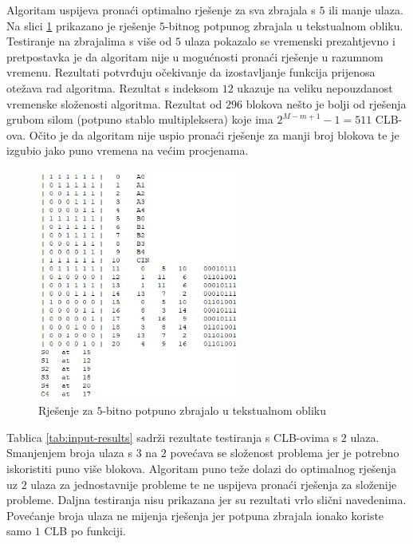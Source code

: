 \documentclass[times, utf8, diplomski]{fer}
\begin{document}
Algoritam uspijeva pronaći optimalno rješenje za sva zbrajala s $5$ ili manje ulaza. Na slici \ref{fig:adder5no-solution} prikazano je rješenje $5$-bitnog potpunog zbrajala u tekstualnom obliku. Testiranje na zbrajalima s više od $5$ ulaza pokazalo se vremenski prezahtjevno i pretpostavka je da algoritam nije u mogućnosti pronaći rješenje u razumnom vremenu. Rezultati potvrđuju očekivanje da izostavljanje funkcija prijenosa otežava rad algoritma. Rezultat s indeksom $12$ ukazuje na veliku nepouzdanost vremenske složenosti algoritma. Rezultat od $296$ blokova nešto je bolji od rješenja grubom silom (potpuno stablo multipleksera) koje ima $2^{M-m+1}-1=511$ CLB-ova. Očito je da algoritam nije uspio pronaći rješenje za manji broj blokova te je izgubio jako puno vremena na većim procjenama.

\begin{figure}[htb]
	\centering
	\includegraphics[width=0.6\textwidth]{img/adder5no_sol.png}
	\caption{Rješenje za $5$-bitno potpuno zbrajalo u tekstualnom obliku}
	\label{fig:adder5no-solution}
\end{figure}

Tablica \ref{tab:input-results} sadrži rezultate testiranja s CLB-ovima s $2$ ulaza. Smanjenjem broja ulaza s $3$ na $2$ povećava se složenost problema jer je potrebno iskoristiti puno više blokova. Algoritam puno teže dolazi do optimalnog rješenja uz $2$ ulaza za jednostavnije probleme te ne uspijeva pronaći rješenja za složenije probleme. Daljna testiranja nisu prikazana jer su rezultati vrlo slični navedenima. Povećanje broja ulaza ne mijenja rješenja jer potpuna zbrajala ionako koriste samo $1$ CLB po funkciji.
\end{document}
